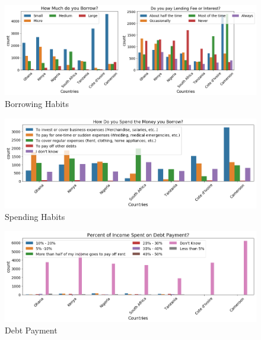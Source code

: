 \begin{Schunk}
\begin{figure}[H]

{\centering \includegraphics[width=1.15\linewidth]{../../artifacts/borrowing} 

}

\caption[Borrowing Habits]{Borrowing Habits}\label{fig:bh}
\end{figure}
\end{Schunk}

\begin{Schunk}
\begin{figure}[H]

{\centering \includegraphics[width=1.15\linewidth]{../../artifacts/spending} 

}

\caption[Spending Habits]{Spending Habits}\label{fig:sh}
\end{figure}
\end{Schunk}

\begin{Schunk}
\begin{figure}[H]

{\centering \includegraphics[width=1.15\linewidth]{../../artifacts/payment} 

}

\caption[Debt Payment]{Debt Payment}\label{fig:dtp}
\end{figure}
\end{Schunk}

